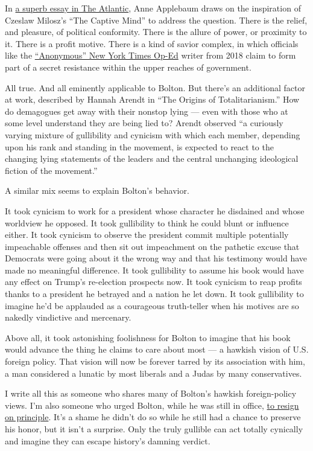 In
\href{https://www.theatlantic.com/magazine/archive/2020/07/trumps-collaborators/612250/}{a
superb essay in The Atlantic}, Anne Applebaum draws on the inspiration
of Czeslaw Milosz's ``The Captive Mind'' to address the question. There
is the relief, and pleasure, of political conformity. There is the
allure of power, or proximity to it. There is a profit motive. There is
a kind of savior complex, in which officials like the
\href{https://www.nytimes3xbfgragh.onion/2018/09/05/opinion/trump-white-house-anonymous-resistance.html}{``Anonymous''
New York Times Op-Ed} writer from 2018 claim to form part of a secret
resistance within the upper reaches of government.

All true. And all eminently applicable to Bolton. But there's an
additional factor at work, described by Hannah Arendt in ``The Origins
of Totalitarianism.'' How do demagogues get away with their nonstop
lying --- even with those who at some level understand they are being
lied to? Arendt observed ``a curiously varying mixture of gullibility
and cynicism with which each member, depending upon his rank and
standing in the movement, is expected to react to the changing lying
statements of the leaders and the central unchanging ideological fiction
of the movement.''

A similar mix seems to explain Bolton's behavior.

It took cynicism to work for a president whose character he disdained
and whose worldview he opposed. It took gullibility to think he could
blunt or influence either. It took cynicism to observe the president
commit multiple potentially impeachable offenses and then sit out
impeachment on the pathetic excuse that Democrats were going about it
the wrong way and that his testimony would have made no meaningful
difference. It took gullibility to assume his book would have any effect
on Trump's re-election prospects now. It took cynicism to reap profits
thanks to a president he betrayed and a nation he let down. It took
gullibility to imagine he'd be applauded as a courageous truth-teller
when his motives are so nakedly vindictive and mercenary.

Above all, it took astonishing foolishness for Bolton to imagine that
his book would advance the thing he claims to care about most --- a
hawkish vision of U.S. foreign policy. That vision will now be forever
tarred by its association with him, a man considered a lunatic by most
liberals and a Judas by many conservatives.

I write all this as someone who shares many of Bolton's hawkish
foreign-policy views. I'm also someone who urged Bolton, while he was
still in office,
\href{https://www.google.com/amp/s/www.nytimes3xbfgragh.onion/2018/07/19/opinion/mike-pompeo-john-bolton-resign.amp.html}{to
resign on principle}. It's a shame he didn't do so while he still had a
chance to preserve his honor, but it isn't a surprise. Only the truly
gullible can act totally cynically and imagine they can escape history's
damning verdict.

